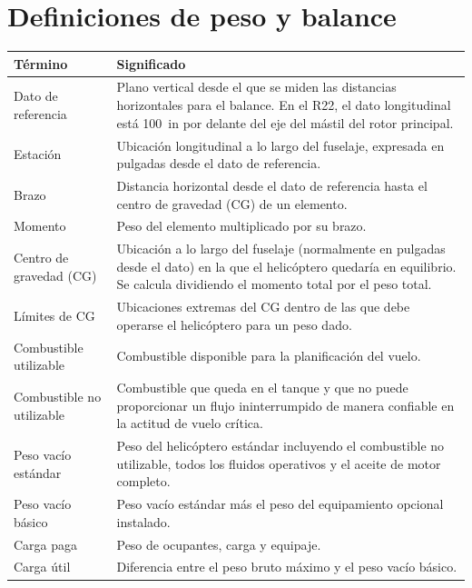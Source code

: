 \section{Definiciones de peso y balance}

\begin{longtable}{@{}L{2.6cm}p{\dimexpr\linewidth-2.6cm-2\tabcolsep}@{}}
\toprule
Término & Significado \\
\midrule
\endhead
Dato de referencia & Plano vertical desde el que se miden las distancias horizontales para el balance. En el R22, el dato longitudinal está 100~in por delante del eje del mástil del rotor principal. \\
Estación & Ubicación longitudinal a lo largo del fuselaje, expresada en pulgadas desde el dato de referencia. \\
Brazo & Distancia horizontal desde el dato de referencia hasta el centro de gravedad (CG) de un elemento. \\
Momento & Peso del elemento multiplicado por su brazo. \\
Centro de gravedad (CG) & Ubicación a lo largo del fuselaje (normalmente en pulgadas desde el dato) en la que el helicóptero quedaría en equilibrio. Se calcula dividiendo el momento total por el peso total. \\
Límites de CG & Ubicaciones extremas del CG dentro de las que debe operarse el helicóptero para un peso dado. \\
Combustible utilizable & Combustible disponible para la planificación del vuelo. \\
Combustible no utilizable & Combustible que queda en el tanque y que no puede proporcionar un flujo ininterrumpido de manera confiable en la actitud de vuelo crítica. \\
Peso vacío estándar & Peso del helicóptero estándar incluyendo el combustible no utilizable, todos los fluidos operativos y el aceite de motor completo. \\
Peso vacío básico & Peso vacío estándar más el peso del equipamiento opcional instalado. \\
Carga paga & Peso de ocupantes, carga y equipaje. \\
Carga útil & Diferencia entre el peso bruto máximo y el peso vacío básico. \\
\bottomrule
\end{longtable}
